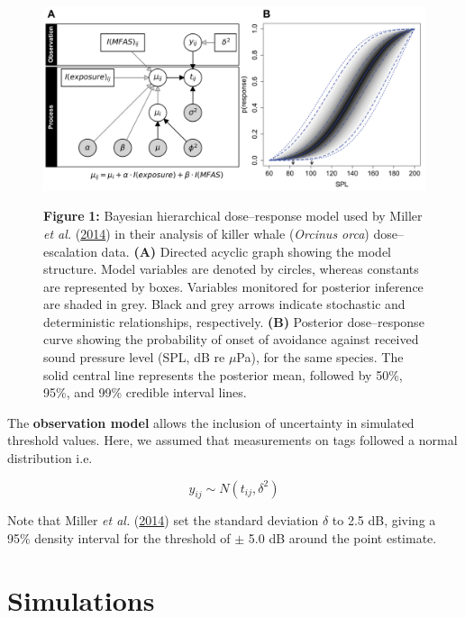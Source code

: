 \documentclass[
]{article}
\begin{document}
\begin{figure}

{\centering \includegraphics[width=1\linewidth]{fig/fig_Miller_model} 

}

\textbf{Figure }{\textbf{1:} \hypertarget{fig1}{}Bayesian hierarchical dose--response model used by Miller \emph{et al.} (\protect\hyperlink{ref-Miller2014}{2014}) in their analysis of killer whale (\emph{Orcinus orca}) dose--escalation data. \textbf{(A)} Directed acyclic graph showing the model structure. Model variables are denoted by circles, whereas constants are represented by boxes. Variables monitored for posterior inference are shaded in grey. Black and grey arrows indicate stochastic and deterministic relationships, respectively. \textbf{(B)} Posterior dose--response curve showing the probability of onset of avoidance against received sound pressure level (SPL, dB re \(\mu\)Pa), for the same species. The solid central line represents the posterior mean, followed by 50\%, 95\%, and 99\% credible interval lines.}\label{fig:fig1}
\end{figure}

The \textbf{observation model} allows the inclusion of uncertainty in simulated threshold values. Here, we assumed that measurements on tags followed a normal distribution i.e.~

\begin{equation} 
 y_{ij} \sim N(t_{ij}, \delta^2)
  \label{eq:mui}
\end{equation}

Note that Miller \emph{et al.} (\protect\hyperlink{ref-Miller2014}{2014}) set the standard deviation \(\delta\) to 2.5 dB, giving a 95\% density interval for the threshold of \(\pm\) 5.0 dB around the point estimate.

\section{Simulations}
\end{document}
